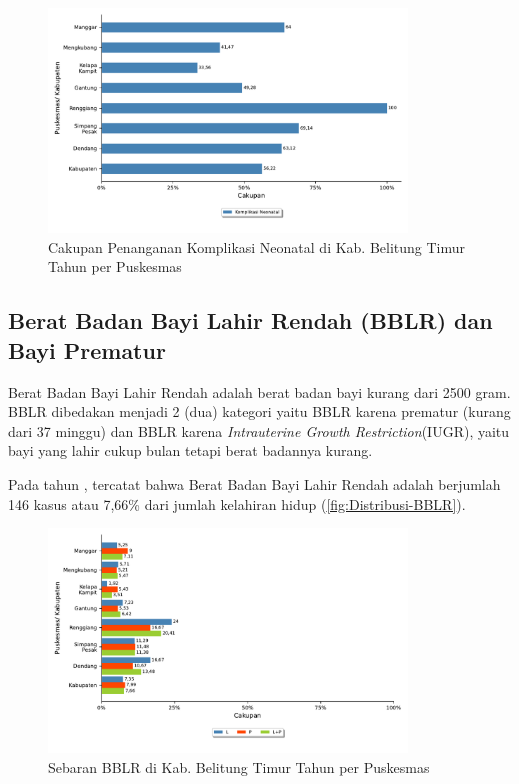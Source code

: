 \begin{figure}[H]
    \centering
    \includegraphics[width=0.85\textwidth]{bab_05/bab_05_12_komplikasiNeonatal}
    \caption{Cakupan Penanganan Komplikasi Neonatal di Kab. Belitung Timur Tahun \tP per Puskesmas}
    \label{fig:Pelayanan-Komplikasi-Neonatal}
\end{figure}


\subsection{Berat Badan Bayi Lahir Rendah (BBLR) dan Bayi Prematur}
Berat Badan Bayi Lahir Rendah adalah berat badan bayi kurang dari
2500 gram. BBLR dibedakan menjadi 2 (dua) kategori yaitu BBLR karena
prematur (kurang dari 37 minggu) dan BBLR karena \emph{Intrauterine Growth Restriction}(IUGR), yaitu bayi yang lahir cukup bulan tetapi berat badannya kurang.

Pada tahun \tP, tercatat bahwa Berat Badan Bayi Lahir Rendah adalah berjumlah
146 kasus atau 7,66\% dari jumlah kelahiran hidup (\autoref{fig:Distribusi-BBLR}).

\begin{figure}[H]
  \centering
  \includegraphics[width=0.85\textwidth]{bab_05/bab_05_13_BBLR}
  \caption{Sebaran BBLR di Kab. Belitung Timur Tahun \tP per Puskesmas}
  \label{fig:Distribusi-BBLR}
\end{figure}

